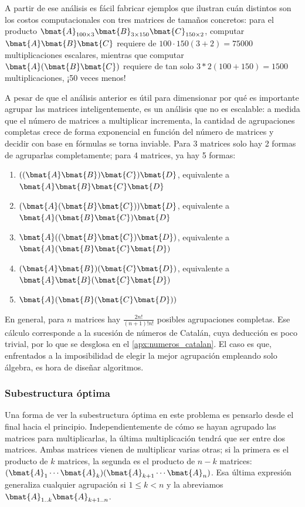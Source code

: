A partir de ese análisis es fácil fabricar ejemplos que ilustran cuán distintos son los costos computacionales con tres matrices de tamaños concretos: para el producto $\bmat{A}_{100\times 3} \bmat{B}_{3 \times 150} \bmat{C}_{150 \times 2}$, computar $\bmat{A} \bmat{B} \bmat{C}$ requiere de $100\cdot 150(3+2) = 75000$ multiplicaciones escalares, mientras que computar $\bmat{A} (\bmat{B} \bmat{C})$ requiere de tan solo $3 * 2(100 + 150) = 1500$ multiplicaciones, ¡50 veces menos!

A pesar de que el análisis anterior es útil para dimensionar por qué es importante agrupar las matrices inteligentemente, es un análisis que no es escalable: a medida que el número de matrices a multiplicar incrementa, la cantidad de agrupaciones completas crece de forma exponencial en función del número de matrices y decidir con base en fórmulas se torna inviable. Para 3 matrices solo hay 2 formas de agruparlas completamente; para 4 matrices, ya hay 5 formas: 
\begin{enumerate}
  \item $((\bmat{A} \bmat{B}) \bmat{C}) \bmat{D}$, equivalente a $\bmat{A} \bmat{B} \bmat{C} \bmat{D}$
  \item $(\bmat{A} (\bmat{B} \bmat{C})) \bmat{D}$, equivalente a $\bmat{A} (\bmat{B} \bmat{C}) \bmat{D}$
  \item $\bmat{A} ((\bmat{B} \bmat{C}) \bmat{D})$, equivalente a $\bmat{A} (\bmat{B} \bmat{C} \bmat{D})$
  \item $(\bmat{A} \bmat{B}) (\bmat{C} \bmat{D})$, equivalente a $\bmat{A} \bmat{B} (\bmat{C} \bmat{D})$
  \item $\bmat{A} (\bmat{B} (\bmat{C} \bmat{D}))$
\end{enumerate}
En general, para $n$ matrices hay $\frac{2n!}{(n+1)!n!}$ posibles agrupaciones completas. Ese cálculo corresponde a la sucesión de números de Catalán, cuya deducción es poco trivial, por lo que se desglosa en el \ref{apx:numeros_catalan}. El caso es que, enfrentados a la imposibilidad de elegir la mejor agrupación empleando solo álgebra, es hora de diseñar algoritmos.

\subsubsection{Subestructura óptima}

Una forma de ver la subestructura óptima en este problema es pensarlo desde el final hacia el principio.  Independientemente de cómo se hayan agrupado las matrices para multiplicarlas, la última multiplicación tendrá que ser entre dos matrices. Ambas matrices vienen de multiplicar varias otras; si la primera es el producto de $k$ matrices, la segunda es el producto de $n-k$ matrices: $(\bmat{A}_1 \cdots \bmat{A}_k)(\bmat{A}_{k+1}\cdots \bmat{A}_n)$. Esa última expresión generaliza cualquier agrupación si $1\leq k < n$ y la abreviamos $\bmat{A}_{1..k} \bmat{A}_{k+1..n}$.  

